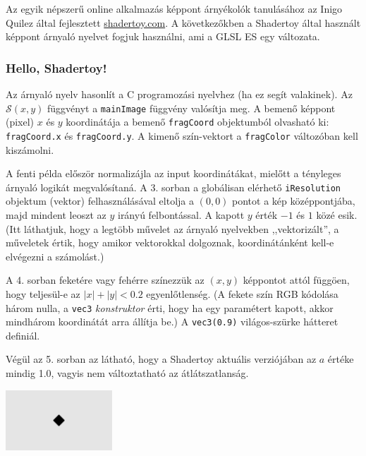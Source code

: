 Az egyik népszerű online alkalmazás képpont árnyékolók tanulásához az Inigo Quilez által fejlesztett
\url{shadertoy.com}. A következőkben a Shadertoy által használt képpont árnyaló nyelvet fogjuk használni,
ami a GLSL ES egy változata.

\subsubsection{Hello, Shadertoy!}

Az árnyaló nyelv hasonlít a C programozási nyelvhez (ha ez segít valakinek). Az $\mathcal{S}(x,y)$
függvényt a \texttt{mainImage} függvény valósítja meg. A bemenő képpont (pixel) $x$ és $y$ koordinátája
a bemenő \texttt{fragCoord} objektumból olvasható ki: \texttt{fragCoord.x} és \texttt{fragCoord.y}.
A kimenő szín-vektort a \texttt{fragColor} változóban kell kiszámolni.


A fenti példa először normalizájla az input koordinátákat, mielőtt a tényleges árnyaló logikát megvalósítaná.
A 3. sorban a globálisan elérhető \texttt{iResolution} objektum (vektor) felhasználásával eltolja a $(0, 0)$ pontot
a kép középpontjába, majd mindent leoszt az $y$ irányú felbontással. A kapott $y$ érték $-1$ és $1$ közé esik.
(Itt láthatjuk, hogy a legtöbb művelet az árnyaló nyelvekben ,,vektorizált'', a műveletek értik, hogy amikor
vektorokkal dolgoznak, koordinátánként kell-e elvégezni a számolást.)

A 4. sorban feketére vagy fehérre színezzük az $(x, y)$ képpontot attól függöen, hogy teljesül-e
az $|x|+|y| < 0.2$ egyenlőtlenség.
(A fekete szín RGB kódolása három nulla, a \texttt{vec3} \emph{konstruktor}
érti, hogy ha egy paramétert kapott, akkor mindhárom koordinátát arra állítja be.)
A \texttt{vec3(0.9)} világos-szürke hátteret definiál.

Végül az 5. sorban az látható, hogy a Shadertoy aktuális verziójában az $a$ értéke mindig 1.0, vagyis
nem változtatható az átlátszatlanság.

\begin{center}
\includegraphics[width=4cm]{images/hello.png}
\end{center}

